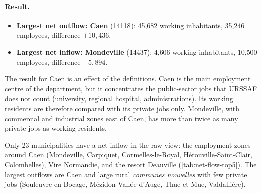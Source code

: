 \paragraph{Result.}
\begin{itemize}
  \item \textbf{Largest net outflow: Caen} (14118): 45{,}682 working inhabitants, 35{,}246 employees, difference
  $+10{,}436$.
  \item \textbf{Largest net inflow: Mondeville} (14437): 4{,}606 working inhabitants, 10{,}500 employees, difference
  $-5{,}894$.
\end{itemize}
The result for Caen is an effect of the definitions. Caen is the main employment centre of the department, but it
concentrates the public-sector jobs that URSSAF does not count (university, regional hospital, administrations).
Its working residents are therefore compared with its private jobs only. Mondeville, with commercial and industrial zones
east of Caen, has more than twice as many private jobs as working residents.

Only 23 municipalities have a net inflow in the raw view: the employment zones around Caen (Mondeville, Carpiquet,
Cormelles-le-Royal, H\'erouville-Saint-Clair, Colombelles), Vire Normandie, and the resort Deauville
(\cref{tab:net-flow-top5}). The largest outflows are Caen and large rural \emph{communes nouvelles} with few private
jobs (Souleuvre en Bocage, M\'ezidon Vall\'ee d'Auge, Thue et Mue, Valdalli\`ere).

